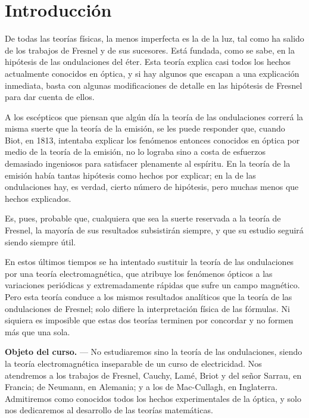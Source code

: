 \chapter*{Introducción}

De todas las teorías físicas, la menos imperfecta es la de la luz, tal
como ha salido de los trabajos de Fresnel y de sus sucesores. Está
fundada, como se sabe, en la hipótesis de las ondulaciones del éter. Esta
teoría explica casi todos los hechos actualmente conocidos en óptica, y si
hay algunos que escapan a una explicación inmediata, basta con algunas
modificaciones de detalle en las hipótesis de Fresnel para dar cuenta de
ellos.

A los escépticos que piensan que algún día la teoría de las ondulaciones
correrá la misma suerte que la teoría de la emisión, se les puede
responder que, cuando Biot, en 1813, intentaba explicar los fenómenos
entonces conocidos en óptica por medio de la teoría de la emisión, no lo
lograba sino a costa de esfuerzos demasiado ingeniosos para satisfacer
plenamente al espíritu. En la teoría de la emisión había tantas hipótesis
como hechos por explicar; en la de las ondulaciones hay, es verdad, cierto
número de hipótesis, pero muchas menos que hechos explicados.

Es, pues, probable que, cualquiera que sea la suerte reservada a la
teoría de Fresnel, la mayoría de sus resultados subsistirán siempre, y que
su estudio seguirá siendo siempre útil.

En estos últimos tiempos se ha intentado sustituir la teoría de las
ondulaciones por una teoría electromagnética, que atribuye los fenómenos
ópticos a las variaciones periódicas y extremadamente rápidas que sufre un
campo magnético. Pero esta teoría conduce a los mismos resultados
analíticos que la teoría de las ondulaciones de Fresnel; solo difiere la
interpretación física de las fórmulas. Ni siquiera es imposible que estas
dos teorías terminen por concordar y no formen más que una sola.

\noindent\textbf{Objeto del curso.} — No estudiaremos sino la teoría de
las ondulaciones, siendo la teoría electromagnética inseparable de un
curso de electricidad. Nos atendremos a los trabajos de Fresnel, Cauchy,
Lamé, Briot y del señor Sarrau, en Francia; de Neumann, en Alemania; y a
los de Mac-Cullagh, en Inglaterra. Admitiremos como conocidos todos los
hechos experimentales de la óptica, y solo nos dedicaremos al desarrollo
de las teorías matemáticas.

